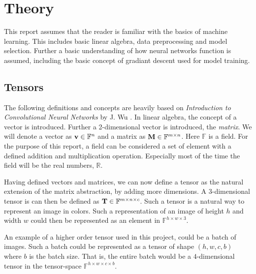\chapter{Theory}
This report assumes that the reader is familiar with the basics of machine learning.
This includes basic linear algebra, data preprocessing and model selection.
Further a basic understanding of how neural networks function is assumed,
including the basic concept of gradiant descent used for model training.


\section{Tensors}
The following definitions and concepts are heavily based on \textit{Introduction to Convolutional Neural Networks} by J. Wu \cite{tensorIntroduction}.
In linear algebra, the concept of a vector is introduced.
Further a 2-dimensional vector is introduced, the \textit{matrix}.
We will denote a vector as $\textbf{v}\in \mathbb{F}^n$ and a matrix as $\textbf{M}\in \mathbb{F}^{m\times n}$.
Here $\mathbb{F}$ is a field.
For the purpose of this report, a field can be considered a set of element with a defined addition and multiplication operation.
Especially most of the time the field will be the real numbers, $\mathbb{R}$.

Having defined vectors and matrices, we can now define a tensor as the natural extension of the matrix abstraction,
by adding more dimensions.
A $3$-dimensional tensor is can then be defined as $\textbf{T}\in \mathbb{F}^{m\times n\times c}$.
Such a tensor is a natural way to represent an image in colors.
Such a representation of an image of height $h$ and width $w$ could then be represented as an
element in $\mathbb{F}^{h\times w\times 3}$.

An example of a higher order tensor used in this project, could be a batch of images.
Such a batch could be represented as a tensor of shape $(h, w, c, b)$ where $b$ is the batch size. 
That is, the entire batch would be a $4$-dimensional tensor in the tensor-space $\mathbb{F}^{h\times w\times c\times b}$.

